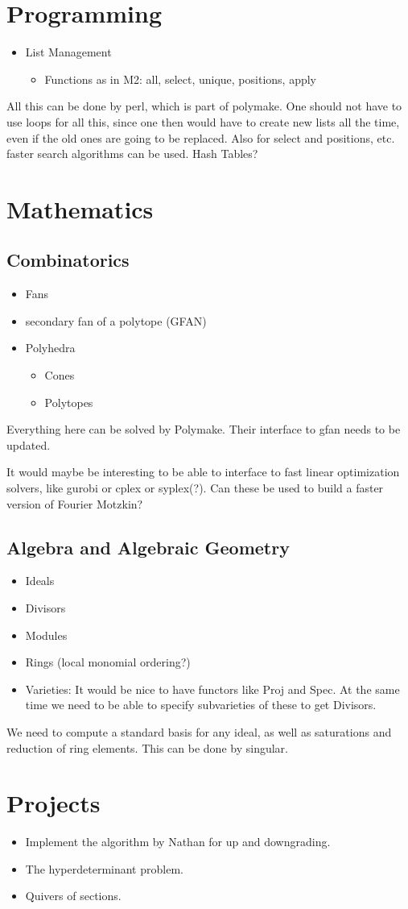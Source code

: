 \documentclass[a4paper]{article}
\begin{document}
\section{Programming}
\begin{itemize}
	\item[] List Management
	\begin{itemize}
		\item[] Functions as in M2: all, select, unique, positions, apply
	\end{itemize}
\end{itemize}
All this can be done by perl, which is part of polymake. One should not have to use loops for all this, since one then would have to create new lists all the time, even if the old ones are going to be replaced. Also for select and positions, etc. faster search algorithms can be used. Hash Tables?
\section{Mathematics}
\subsection{Combinatorics}
\begin{itemize}
	\item[] Fans
   \item[] secondary fan of a polytope (GFAN)
	\item[] Polyhedra
	\begin{itemize}
		\item[] Cones
		\item[] Polytopes
	\end{itemize}
\end{itemize}
Everything here can be solved by Polymake. Their interface to gfan needs to be updated.

It would maybe be interesting to be able to interface to fast linear optimization solvers, like gurobi or cplex or syplex(?). Can these be used to build a faster version of Fourier Motzkin?
\subsection{Algebra and Algebraic Geometry}
\begin{itemize}
   \item[] Ideals
	\item[] Divisors
	\item[] Modules
	\item[] Rings (local monomial ordering?)
	\item[] Varieties: It would be nice to have functors like Proj and Spec. At the same time we need to be able to specify subvarieties of these to get Divisors.
\end{itemize}
We need to compute a standard basis for any ideal, as well as saturations and reduction of ring elements.
This can be done by singular.
\section{Projects}
\begin{itemize}
\item Implement the algorithm by Nathan for up and downgrading.
\item The hyperdeterminant problem.
\item Quivers of sections.
\end{itemize}
\end{document}
